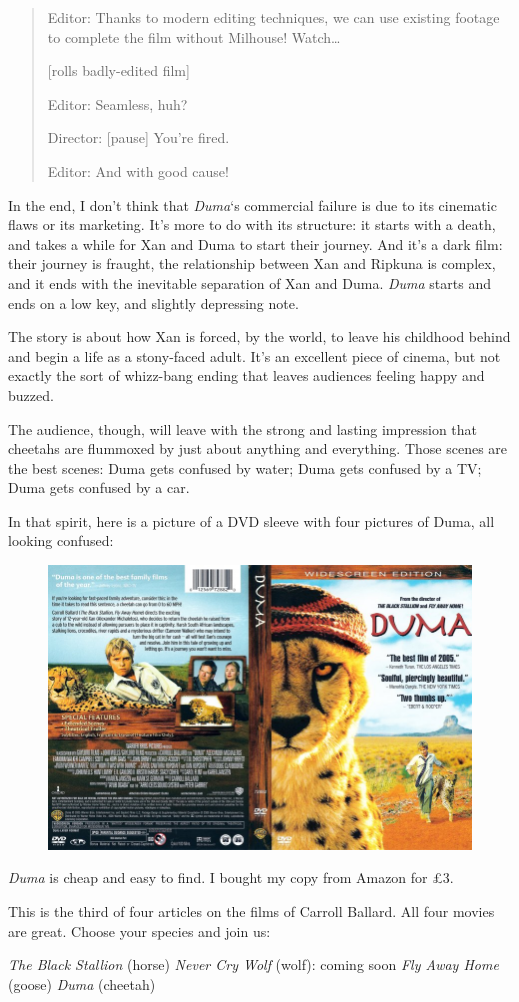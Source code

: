 \begin{quotation}
  Editor: Thanks to modern editing techniques, we can use existing footage to complete the film without Milhouse! Watch…

  [rolls badly-edited film]

  Editor: Seamless, huh?

  Director: [pause] You're fired.

  Editor: And with good cause!
\end{quotation}

In the end, I don't think that \textit{Duma}`s commercial failure is due to its cinematic flaws or its marketing. It's more to do with its structure: it starts with a death, and takes a while for Xan and Duma to start their journey. And it's a dark film: their journey is fraught, the relationship between Xan and Ripkuna is complex, and it ends with the inevitable separation of Xan and Duma. \textit{Duma} starts and ends on a low key, and slightly depressing note.

The story is about how Xan is forced, by the world, to leave his childhood behind and begin a life as a stony-faced adult. It's an excellent piece of cinema, but not exactly the sort of whizz-bang ending that leaves audiences feeling happy and buzzed.

The audience, though, will leave with the strong and lasting impression that cheetahs are flummoxed by just about anything and everything. Those scenes are the best scenes: Duma gets confused by water; Duma gets confused by a TV; Duma gets confused by a car.

In that spirit, here is a picture of a DVD sleeve with four pictures of Duma, all looking confused:

\begin{figure}
  \begin{center}
    \includegraphics[width=\textwidth]{content/assets/duma--2}
  \end{center}
\end{figure}

\textit{Duma} is cheap and easy to find. I bought my copy from Amazon for £3.

This is the third of four articles on the films of Carroll Ballard. All four movies are great. Choose your species and join us:

\textit{The Black Stallion} (horse)
\textit{Never Cry Wolf} (wolf): coming soon
\textit{Fly Away Home} (goose)
\textit{Duma} (cheetah)
